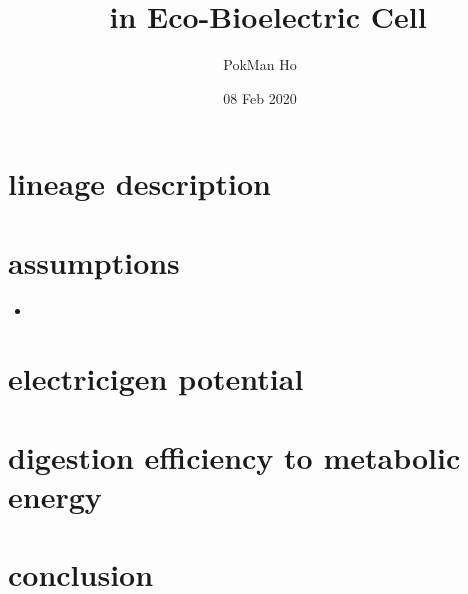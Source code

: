 \documentclass[a4paper,11pt]{article}
\title{\ec\ in Eco-Bioelectric Cell}
\author{PokMan Ho}
\date{08 Feb 2020}
\begin{document}
    \maketitle
    \tableofcontents
    \clearpage
    
    \section{lineage description}
    
    \section{assumptions}
    \begin{itemize}
        \item 
    \end{itemize}
    
    \section{electricigen potential}
    
    \section{digestion efficiency to metabolic energy}
    
    \section{conclusion}
    
    \nocite{*}\printbibliography
\end{document}
